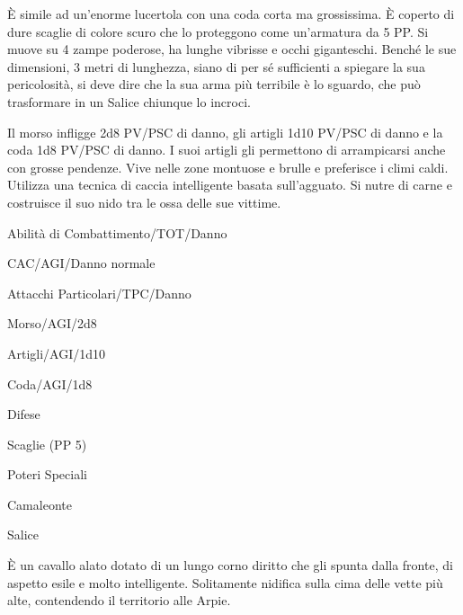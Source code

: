 
\`E simile ad un'enorme lucertola con una coda corta ma grossissima.
\`E coperto di dure scaglie di colore scuro che lo proteggono come
un'armatura da 5 PP. Si muove su 4 zampe poderose, ha lunghe vibrisse
e occhi giganteschi. Bench\'e le sue dimensioni, 3 metri di lunghezza,
siano di per s\'e sufficienti a spiegare la sua pericolosit\`a, si
deve dire che la sua arma pi\`u terribile \`e lo sguardo, che pu\`o
trasformare in un Salice chiunque lo incroci.

Il morso infligge 2d8 PV/PSC di danno, gli artigli 1d10 PV/PSC di
danno e la coda 1d8 PV/PSC di danno. I suoi artigli gli permettono di
arrampicarsi anche con grosse pendenze. Vive nelle zone montuose e
brulle e preferisce i climi caldi. Utilizza una tecnica di caccia
intelligente basata sull'agguato. Si nutre di carne e costruisce il
suo nido tra le ossa delle sue vittime.


\begin{parmostro}{Abilit\`a di Combattimento/TOT/Danno}
\item CAC/AGI/Danno normale
\end{parmostro}

\begin{parmostro}{Attacchi Particolari/TPC/Danno}
\item Morso/AGI/2d8
\item Artigli/AGI/1d10
\item Coda/AGI/1d8
\end{parmostro}

\begin{parmostro}{Difese}
\item Scaglie (PP 5)
\end{parmostro}

\begin{parmostro}{Poteri Speciali}
\item Camaleonte 
\item Salice
\end{parmostro}


\`E un cavallo alato dotato di un lungo corno diritto che gli spunta
dalla fronte, di aspetto esile e molto intelligente. Solitamente nidifica sulla
cima delle vette pi\`u alte, contendendo il territorio alle Arpie. 


